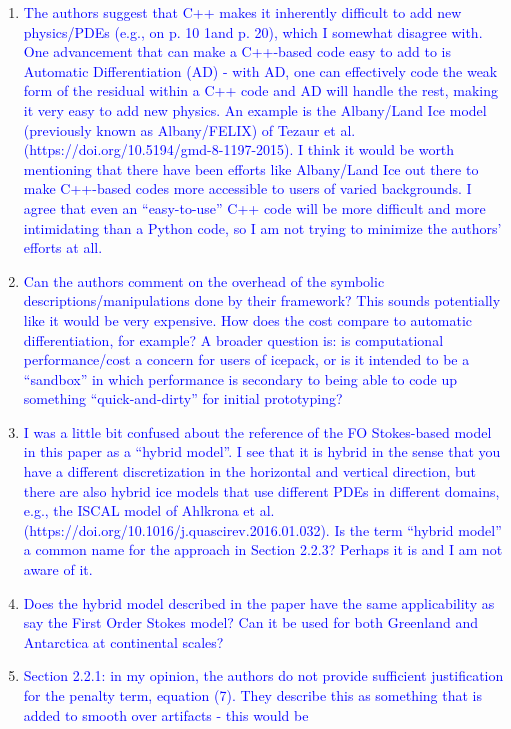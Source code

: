 \documentclass{article}
\theoremstyle{definition}
\theoremstyle{plain}
\begin{document}
\begin{enumerate}
\item \textcolor{blue}{The authors suggest that C++ makes it inherently difficult to add new physics/PDEs (e.g., on p. 10
1and p. 20), which I somewhat disagree with. One advancement that can make a C++-based code
easy to add to is Automatic Differentiation (AD) - with AD, one can effectively code the weak form
of the residual within a C++ code and AD will handle the rest, making it very easy to add new
physics. An example is the Albany/Land Ice model (previously known as Albany/FELIX) of Tezaur
et al. (https://doi.org/10.5194/gmd-8-1197-2015). I think it would be worth mentioning that
there have been efforts like Albany/Land Ice out there to make C++-based codes more accessible to
users of varied backgrounds. I agree that even an “easy-to-use” C++ code will be more difficult and
more intimidating than a Python code, so I am not trying to minimize the authors’ efforts at all.}
\item \textcolor{blue}{Can the authors comment on the overhead of the symbolic descriptions/manipulations done by their
framework? This sounds potentially like it would be very expensive. How does the cost compare to
automatic differentiation, for example? A broader question is: is computational performance/cost a
concern for users of icepack, or is it intended to be a “sandbox” in which performance is secondary
to being able to code up something “quick-and-dirty” for initial prototyping?}
\item \textcolor{blue}{I was a little bit confused about the reference of the FO Stokes-based model in this paper as a “hybrid
model”. I see that it is hybrid in the sense that you have a different discretization in the horizontal and
vertical direction, but there are also hybrid ice models that use different PDEs in different domains,
e.g., the ISCAL model of Ahlkrona et al. (https://doi.org/10.1016/j.quascirev.2016.01.032).
Is the term “hybrid model” a common name for the approach in Section 2.2.3? Perhaps it is and I
am not aware of it.}
\item \textcolor{blue}{Does the hybrid model described in the paper have the same applicability as say the First Order
Stokes model? Can it be used for both Greenland and Antarctica at continental scales?}
\item \textcolor{blue}{Section 2.2.1: in my opinion, the authors do not provide sufficient justification for the penalty term,
equation (7). They describe this as something that is added to smooth over artifacts - this would be
}
\end{enumerate}
\end{document}
